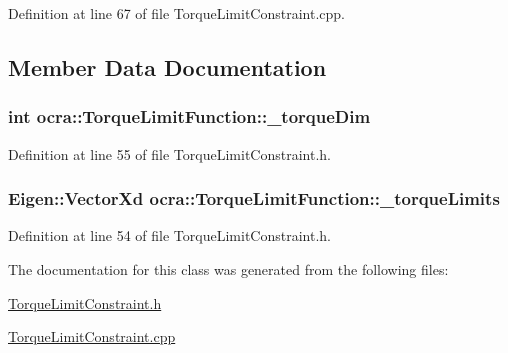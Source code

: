 Definition at line 67 of file Torque\+Limit\+Constraint.\+cpp.



\subsection{Member Data Documentation}
\subsubsection[{\texorpdfstring{\+\_\+torque\+Dim}{_torqueDim}}]{\setlength{\rightskip}{0pt plus 5cm}int ocra\+::\+Torque\+Limit\+Function\+::\+\_\+torque\+Dim\hspace{0.3cm}{\ttfamily [protected]}}\hypertarget{classocra_1_1TorqueLimitFunction_ae7eed81decd37aa8bb6baeb47c5fb4d0}{}\label{classocra_1_1TorqueLimitFunction_ae7eed81decd37aa8bb6baeb47c5fb4d0}


Definition at line 55 of file Torque\+Limit\+Constraint.\+h.

\subsubsection[{\texorpdfstring{\+\_\+torque\+Limits}{_torqueLimits}}]{\setlength{\rightskip}{0pt plus 5cm}Eigen\+::\+Vector\+Xd ocra\+::\+Torque\+Limit\+Function\+::\+\_\+torque\+Limits\hspace{0.3cm}{\ttfamily [protected]}}\hypertarget{classocra_1_1TorqueLimitFunction_a929154bb1273971f123d12ce810fd375}{}\label{classocra_1_1TorqueLimitFunction_a929154bb1273971f123d12ce810fd375}


Definition at line 54 of file Torque\+Limit\+Constraint.\+h.



The documentation for this class was generated from the following files\+:\begin{DoxyCompactItemize}
\item 
\hyperlink{TorqueLimitConstraint_8h}{Torque\+Limit\+Constraint.\+h}\item 
\hyperlink{TorqueLimitConstraint_8cpp}{Torque\+Limit\+Constraint.\+cpp}\end{DoxyCompactItemize}
